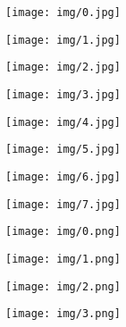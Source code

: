 \documentclass[10pt,twocolumn,letterpaper]{article}
\begin{document}
\begin{figure}
    \centering
    \begin{subfigure}[b]{0.053\textwidth}
        \centering
        \texttt{[image: img/0.jpg]}
    \end{subfigure}
   \begin{subfigure}[b]{0.053\textwidth}
   \centering
        \texttt{[image: img/1.jpg]}
    \end{subfigure}
    \begin{subfigure}[b]{0.053\textwidth}
    \centering
        \texttt{[image: img/2.jpg]}
    \end{subfigure}
    \begin{subfigure}[b]{0.053\textwidth}
    \centering
        \texttt{[image: img/3.jpg]}
    \end{subfigure}
    \begin{subfigure}[b]{0.053\textwidth}
    \centering
        \texttt{[image: img/4.jpg]}
    \end{subfigure}
    \begin{subfigure}[b]{0.053\textwidth}
    \centering
        \texttt{[image: img/5.jpg]}
    \end{subfigure}
    \begin{subfigure}[b]{0.053\textwidth}
    \centering
        \texttt{[image: img/6.jpg]}
    \end{subfigure}
    \begin{subfigure}[b]{0.053\textwidth}
    \centering
        \texttt{[image: img/7.jpg]}
    \end{subfigure}
    \begin{subfigure}[b]{0.053\textwidth}
        \centering
        \texttt{[image: img/0.png]}
    \end{subfigure}
   \begin{subfigure}[b]{0.053\textwidth}
   \centering
        \texttt{[image: img/1.png]}
    \end{subfigure}
    \begin{subfigure}[b]{0.053\textwidth}
    \centering
        \texttt{[image: img/2.png]}
    \end{subfigure}
    \begin{subfigure}[b]{0.053\textwidth}
    \centering
        \texttt{[image: img/3.png]}
    \end{subfigure}

\end{figure}
\end{document}
